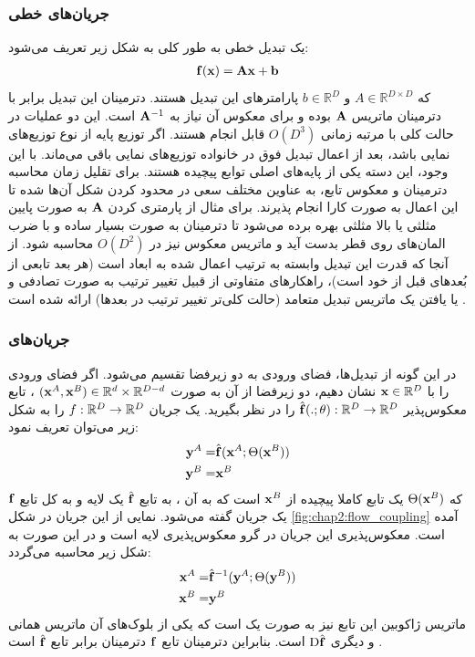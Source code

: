 \subsubsection{جریان‌های خطی}
یک تبدیل خطی به طور کلی به شکل زیر تعریف می‌شود:
\begin{align}
{\bf f}({\bf x}) = {\bf A}{\bf x} + {\bf b}
\end{align}
که $A \in \mathbb{R}^{D \times D}$ و $b \in \mathbb{R}^D$ پارامتر‌های این تبدیل هستند. دترمینان این تبدیل برابر با دترمینان ماتریس ${\bf A}$ بوده و برای معکوس آن نیاز به ${\bf A}^{-1}$ است.
این دو عملیات در حالت کلی با مرتبه زمانی
$O(D^3)$
قابل انجام هستند. اگر توزیع پایه از نوع توزیع‌های نمایی باشد، بعد از اعمال تبدیل فوق در خانواده توزیع‌های نمایی باقی می‌ماند. با این وجود، این دسته یکی از پایه‌های اصلی توابع پیچیده هستند. برای تقلیل زمان محاسبه دترمینان و معکوس تابع، به عناوین مختلف سعی در محدود کردن شکل آن‌ها شده تا این اعمال به صورت کارا انجام پذیرند. برای مثال از پارمتری کردن ${\bf A}$ به صورت پایین مثلثی یا بالا مثلثی بهره برده می‌شود تا دترمینان به صورت بسیار ساده و با ضرب المان‌های روی قطر بدست آید و ماتریس معکوس نیز در $O(D^2)$ محاسبه شود. از آنجا که قدرت این تبدیل وابسته به ترتیب اعمال شده به ابعاد است (هر بعد تابعی از بُعدهای قبل از خود است)، راهکارهای متفاوتی از قبیل تغییر ترتیب به صورت تصادفی و یا یافتن یک ماتریس تبدیل متعامد (حالت کلی‌تر تغییر ترتیب در بعدها) ارائه شده است \cite{flow_survey, glow}.
\subsubsection{جریان‌های
}
در این گونه از تبدیل‌ها، فضای ورودی به دو زیرفضا تقسیم می‌شود. اگر فضای ورودی را با
${\bf x} \in {\mathbb{R}}^D$
نشان دهیم، دو زیرفضا از آن به صورت
$({\bf x}^A, {\bf x}^B) \in {\mathbb{R}}^d \times {\mathbb{R}}^{D - d}$
، تابع معکوس‌پذیر
$\hat{{\bf f}}(.; \theta) : {\mathbb{R}}^D \rightarrow {\mathbb{R}}^D$
را در نظر بگیرید. یک جریان \coupling{}
$f : {\mathbb{R}}^D \rightarrow {\mathbb{R}}^D$
را به شکل زیر می‌توان تعریف نمود:
\begin{align}
{\bf y}^A = & \hat{{\bf f}} ({\bf x}^A; \Theta({\bf x}^B))
\nonumber
\\
{\bf y}^B = & {\bf x}^B
\end{align}
که $\Theta({\bf x}^B)$ یک تابع کاملا پیچیده از ${\bf x}^B$ است که به آن
، به تابع $\hat{{\bf f}}$ یک لایه \coupling{} و به کل تابع ${\bf f}$ یک جریان \coupling{} گفته می‌شود. نمایی از این جریان در شکل \ref{fig:chap2:flow_coupling} آمده است. معکوس‌پذیری این جریان در گرو معکوس‌پذیری لایه \coupling{} است و در این صورت به شکل زیر محاسبه می‌گردد:
\begin{align}
{\bf x}^A = & \hat{{\bf f}}^{-1} ({\bf y}^A; \Theta({\bf y}^B))
\nonumber
\\
{\bf x}^B = & {\bf y}^B
\end{align}
ماتریس ژاکوبین این تابع نیز به صورت یک
است که یکی از بلوک‌های آن ماتریس همانی و دیگری $\text{D}\hat{{\bf f}}$ است. بنابراین دترمینان  تابع ${\bf f}$ دترمینان برابر تابع $\hat{{\bf f}}$ است \cite{flow_survey, realnvp, glow}.

